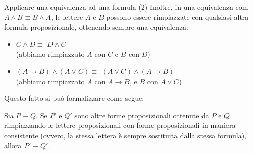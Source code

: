 \documentclass[aspectratio=169,10pt,dvipsnames,handout]{beamer}
\begin{document}
\begin{frame}{Applicare una equivalenza ad una formula (2)}
    Inoltre, in una equivalenza com $A \wedge B \equiv B \wedge A$, le lettere $A$ e $B$ possono essere rimpiazzate con qualsiasi altra formula proposizionale, ottenendo sempre una equivalenza:
    \begin{itemize}
        \item $C \wedge D \equiv$ \pause $D \wedge C$ \\
                (abbiamo rimpiazzato $A$ con $C$ e $B$ con $D$)
        \item $(A \to B) \wedge (A \vee C) \equiv$ \pause $(A \vee C) \wedge (A \to B)$\\
            (abbiamo rimpiazzato $A$ con $A \to B$, e $B$ con $A \vee C$)
    \end{itemize}

    \pause\medskip
    Questo fatto si può formalizzare come segue:
    \begin{theorem}
        Sia $P \equiv Q$. Se $P'$ e $Q'$ sono altre forme proposizionali ottenute da $P$ e $Q$ rimpiazzando le lettere proposizionali con forme proposizionali in maniera consistente (ovvero, la stessa lettera è sempre sostituita dalla stessa formula), allora $P' \equiv Q'$.
    \end{theorem}
\end{frame}


\end{document}

